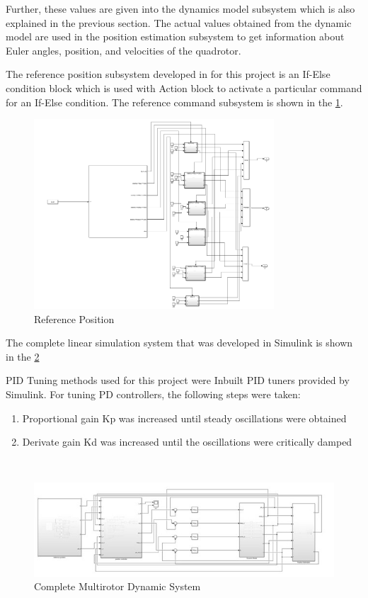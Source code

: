 { Further, these values are given into the dynamics model subsystem which is also explained in the previous section. The actual values obtained from the dynamic model are used in the position estimation subsystem to get information about Euler angles, position, and velocities of the quadrotor. 
 
 The reference position subsystem developed in for this project is an If-Else condition block which is used with Action block to activate a particular command for an If-Else condition. The reference command subsystem is shown in the \ref{fig:rp}.
 \begin{figure}
 	\centering
 	\includegraphics[width=0.8\textwidth]{Images/rp}
 	\caption{Reference Position}
 	\label{fig:rp}
 \end{figure}

The complete linear simulation system that was developed in Simulink is shown in the \ref{fig:cm} 

PID Tuning methods used for this project were Inbuilt PID tuners provided by Simulink. For tuning PD controllers, the following steps were taken:
\begin{enumerate}
	\item Proportional gain Kp was increased until steady oscillations were obtained
	\item Derivate gain Kd was increased until the oscillations were critically damped
\end{enumerate} \\

\begin{figure}
	\centering
	\includegraphics[width=1.1\textwidth]{Images/multirotor}
	\caption{Complete Multirotor Dynamic System}
	\label{fig:cm}
\end{figure}

}
